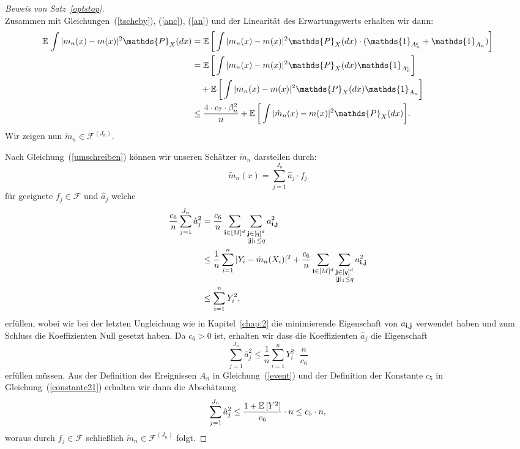 \begin{proof}[Beweis von Satz~\ref{optstop}]
\begin{equation}
\end{equation}
Zusammen mit Gleichungen~(\ref{tscheby}), (\ref{anc}), (\ref{an}) und der Linearität des Erwartungswerts erhalten wir dann:
\begin{equation}
\label{originaleq}
\begin{split}
\E \int |m_n(x) - m(x)|^2 \mathds{P}_X(dx) & = \E \bigg[\int |m_n(x) - m(x)|^2 \mathds{P}_X(dx) \cdot (\mathds{1}_{A_n^{\mathsf{c}}} + \mathds{1}_{A_n})\bigg] \\
& = \E \bigg[\int |m_n(x) - m(x)|^2 \mathds{P}_X(dx) \mathds{1}_{A_n^{\mathsf{c}}}\bigg] \\
& \quad + \E \bigg[\int |m_n(x) - m(x)|^2 \mathds{P}_X(dx) \mathds{1}_{A_n}\bigg] \\
& \leq \frac{4 \cdot c_7 \cdot \beta_n^2}{n} + \E \bigg[\int |\hat{m}_n(x) - m(x)|^2 \mathds{P}_X(dx)\bigg].
\end{split}
\end{equation}
Wir zeigen nun $\tilde{m}_n \in \mathcal{F}^{(J_n)}$.

Nach Gleichung~(\ref{umschreiben}) können wir unseren Schätzer $\tilde{m}_n$ darstellen durch:
$$\tilde{m}_n(x) = \sum_{j = 1}^{J_n}\hat{a}_j \cdot f_j$$
für geeignete $f_j \in \mathcal{F}$ und $\hat{a}_j$ welche 
\begin{equation*}
\begin{split}
\frac{c_6}{n}\sum_{j = 1}^{J_n} \hat{a}_j^2 & = \frac{c_6}{n} \sum_{\mathbf{i} \in [M]^d} \sum_{\substack{\mathbf{j} \in [q]^d \\ |\mathbf{j}|_1 \leq q}} a_{\mathbf{i},\mathbf{j}}^2 \\
& \leq \frac{1}{n} \sum_{i = 1}^n|Y_i - \tilde{m}_n(X_i)|^2 + \frac{c_6}{n} \sum_{\mathbf{i} \in [M]^d} \sum_{\substack{\mathbf{j} \in [q]^d \\ |\mathbf{j}|_1 \leq q}} a_{\mathbf{i},\mathbf{j}}^2 \\
& \leq \sum_{i = 1}^n Y_i^2,
\end{split}
\end{equation*}
erfüllen, wobei wir bei der letzten Ungleichung wie in Kapitel~\ref{chap:2} die minimierende Eigenschaft von $a_{\mathbf{i},\mathbf{j}}$ verwendet haben und zum Schluss die Koeffizienten Null gesetzt haben. Da $c_6 > 0$ ist, erhalten wir dass die Koeffizienten $\hat{a}_j$ die Eigenschaft
$$\sum_{j = 1}^{J_n} \hat{a}_j^2  \leq \frac{1}{n}\sum_{i = 1}^n Y_i^2 \cdot \frac{n}{c_6}$$
erfüllen müssen.
Aus der Definition des Ereignissen $A_n$ in Gleichung~(\ref{event}) und der Definition der Konstante $c_5$ in Gleichung~(\ref{constantc21}) erhalten wir dann die Abschätzung
$$\sum_{j = 1}^{J_n}\hat{a}_j^2 \leq \frac{1 + \mathbb{E}\,[Y^2]}{c_6} \cdot n \leq c_5 \cdot n,$$
woraus durch $f_j \in \mathcal{F}$ schließlich $\tilde{m}_n \in \mathcal{F}^{(J_n)}$ folgt.


\end{proof}
